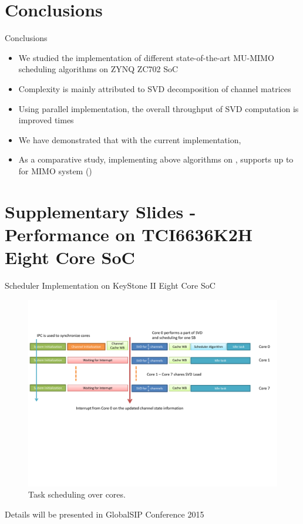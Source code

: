 \documentclass[11pt]{beamer}
\begin{document}
\section{Conclusions}

\begin{frame}{Conclusions}
\begin{itemize}
\item We studied the implementation of different state-of-the-art MU-MIMO scheduling algorithms on ZYNQ ZC702 SoC
\item Complexity is mainly attributed to SVD decomposition of channel matrices
\item Using parallel implementation, the overall throughput of SVD computation is improved  times 
\item We have demonstrated that with the current implementation, 
\item As a comparative study, implementing above algorithms on , supports up to  for  MIMO system ()
\end{itemize}
\end{frame}

\section{Supplementary Slides - Performance on TCI6636K2H Eight Core SoC}

\begin{frame}{Scheduler Implementation on KeyStone II Eight Core SoC\eqn{^\dagger}}
	\begin{figure}
		\centering
		\includegraphics[trim=0in 3.0in 0in 0.5in,width=\columnwidth]{overall_scheduling}
		\caption{Task scheduling over  cores.}
	\end{figure}
	\eqn{^\dagger}\scriptsize{Details will be presented in GlobalSIP Conference 2015}
\end{frame}
\end{document}
